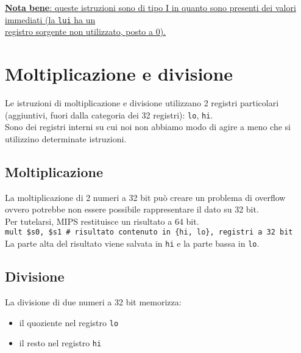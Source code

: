 \documentclass[../main.tex]{subfiles}
\begin{document}
\vspace*{1mm}

\noindent
\underline{\textbf{Nota bene}: queste istruzioni sono di tipo I in quanto
sono presenti dei valori immediati (la \texttt{lui} ha un} \\
\underline{registro sorgente non utilizzato, posto a 0).}

\section{Moltiplicazione e divisione}
Le istruzioni di moltiplicazione e divisione utilizzano 2
registri particolari (aggiuntivi, fuori dalla categoria dei
32 registri): \texttt{lo}, \texttt{hi}. \\
Sono dei registri interni su cui noi non abbiamo modo di agire a meno
che si utilizzino determinate istruzioni.

\begin{table}[h!]
    \hspace*{1cm}
    \begin{minipage}{\linewidth}
        \subsection*{Moltiplicazione}
        La moltiplicazione di 2 numeri a 32 bit può creare un problema
        di overflow ovvero potrebbe non essere possibile
        rappresentare il dato su 32 bit. \\
        Per tutelarsi, MIPS restituisce un risultato a 64 bit. \\
        \hspace*{4mm} \texttt{mult \$s0, \$s1 \hspace*{0cm} \# risultato contenuto
        in \{hi, lo\}, registri a 32 bit} \\
        La parte alta del risultato viene salvata in \texttt{hi} e la parte bassa
        in \texttt{lo}.
    \end{minipage}

    \vspace*{5mm}

    \hspace*{1cm}
    \begin{minipage}{\linewidth}
        \subsection*{Divisione}
        La divisione di due numeri a 32 bit memorizza:
        \begin{itemize}
            \item il quoziente nel registro \texttt{lo}
            \item il resto nel registro \texttt{hi}
        \end{itemize}
    \end{minipage}
\end{table}
\end{document}
